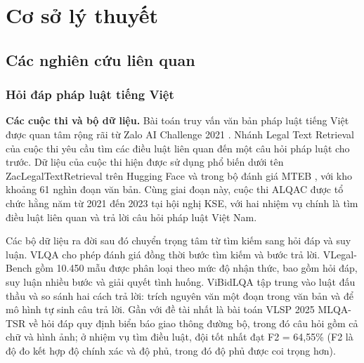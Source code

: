 \chapter{Cơ sở lý thuyết}
\label{chap:co_so_ly_thuyet}

\section{Các nghiên cứu liên quan}
\label{sec:c2_lien_quan}

\subsection{Hỏi đáp pháp luật tiếng Việt}

\textbf{Các cuộc thi và bộ dữ liệu.} Bài toán truy vấn văn bản pháp luật tiếng Việt được quan tâm rộng rãi từ Zalo AI Challenge 2021 \cite{zalo2021legal}. Nhánh Legal Text Retrieval của cuộc thi yêu cầu tìm các điều luật liên quan đến một câu hỏi pháp luật cho trước. Dữ liệu của cuộc thi hiện được sử dụng phổ biến dưới tên ZacLegalTextRetrieval trên Hugging Face và trong bộ đánh giá MTEB \cite{greennode_zalolegal}, với kho khoảng 61 nghìn đoạn văn bản. Cùng giai đoạn này, cuộc thi ALQAC \cite{nguyen2021alqac,nguyen2022alqac,nguyen2023alqac} được tổ chức hằng năm từ 2021 đến 2023 tại hội nghị KSE, với hai nhiệm vụ chính là tìm điều luật liên quan và trả lời câu hỏi pháp luật Việt Nam.

Các bộ dữ liệu ra đời sau đó chuyển trọng tâm từ tìm kiếm sang hỏi đáp và suy luận. VLQA \cite{nguyen2025vlqa} cho phép đánh giá đồng thời bước tìm kiếm và bước trả lời. VLegal-Bench \cite{dong2025vlegalbench} gồm 10.450 mẫu được phân loại theo mức độ nhận thức, bao gồm hỏi đáp, suy luận nhiều bước và giải quyết tình huống. ViBidLQA \cite{nguyen2024vibidlqa} tập trung vào luật đấu thầu và so sánh hai cách trả lời: trích nguyên văn một đoạn trong văn bản và để mô hình tự sinh câu trả lời. Gần với đề tài nhất là bài toán VLSP 2025 MLQA-TSR \cite{luu2025vlsp} về hỏi đáp quy định biển báo giao thông đường bộ, trong đó câu hỏi gồm cả chữ và hình ảnh; ở nhiệm vụ tìm điều luật, đội tốt nhất đạt F2 = 64,55\% (F2 là độ đo kết hợp độ chính xác và độ phủ, trong đó độ phủ được coi trọng hơn).

